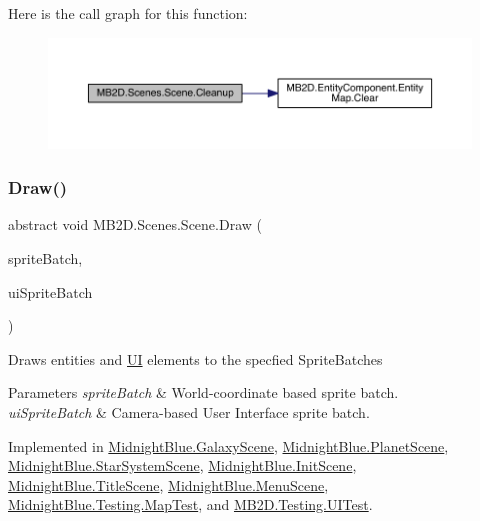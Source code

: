Here is the call graph for this function\+:
\nopagebreak
\begin{figure}[H]
\begin{center}
\leavevmode
\includegraphics[width=350pt]{class_m_b2_d_1_1_scenes_1_1_scene_a3ee3777b94ccff0a739e75ca1ca151c6_cgraph}
\end{center}
\end{figure}
\hypertarget{class_m_b2_d_1_1_scenes_1_1_scene_a932d33071ecb4c5187367825dba72324}{}\label{class_m_b2_d_1_1_scenes_1_1_scene_a932d33071ecb4c5187367825dba72324} 
\subsubsection{\texorpdfstring{Draw()}{Draw()}}
{\footnotesize\ttfamily abstract void M\+B2\+D.\+Scenes.\+Scene.\+Draw (\begin{DoxyParamCaption}\item[{Sprite\+Batch}]{sprite\+Batch,  }\item[{Sprite\+Batch}]{ui\+Sprite\+Batch }\end{DoxyParamCaption})\hspace{0.3cm}{\ttfamily [pure virtual]}}



Draws entities and \hyperlink{namespace_m_b2_d_1_1_u_i}{UI} elements to the specfied Sprite\+Batches 


\begin{DoxyParams}{Parameters}
{\em sprite\+Batch} & World-\/coordinate based sprite batch.\\
\hline
{\em ui\+Sprite\+Batch} & Camera-\/based User Interface sprite batch.\\
\hline
\end{DoxyParams}


Implemented in \hyperlink{class_midnight_blue_1_1_galaxy_scene_a3646fcf97e067bac267d42aad66e71c4}{Midnight\+Blue.\+Galaxy\+Scene}, \hyperlink{class_midnight_blue_1_1_planet_scene_af22a201631e5f8c606ec3f7463635977}{Midnight\+Blue.\+Planet\+Scene}, \hyperlink{class_midnight_blue_1_1_star_system_scene_ac3d90fb8d914d15b912f5da3cc1aa8a0}{Midnight\+Blue.\+Star\+System\+Scene}, \hyperlink{class_midnight_blue_1_1_init_scene_a5d6b21ff45a6c14edcf0bd8318133725}{Midnight\+Blue.\+Init\+Scene}, \hyperlink{class_midnight_blue_1_1_title_scene_a03fa806a36226ec5fd0ce09870109c18}{Midnight\+Blue.\+Title\+Scene}, \hyperlink{class_midnight_blue_1_1_menu_scene_a600112073f48c763a50c802960f5fdaa}{Midnight\+Blue.\+Menu\+Scene}, \hyperlink{class_midnight_blue_1_1_testing_1_1_map_test_a03d0a9349662afafaa301a8581fbf01f}{Midnight\+Blue.\+Testing.\+Map\+Test}, and \hyperlink{class_m_b2_d_1_1_testing_1_1_u_i_test_a9656d2d62517288a7b4387dafe741ea0}{M\+B2\+D.\+Testing.\+U\+I\+Test}.

